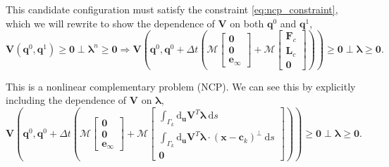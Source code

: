 \documentclass[preprint, 10pt]{elsarticle}
\begin{document}
This candidate configuration must satisfy the constraint
\eqref{eq:ncp_constraint}, which we will rewrite to show the dependence of
$\mathbf{V}$ on both $\mathbf{q}^0$ and $\mathbf{q}^{1}$,
\begin{equation}\label{eq:ncp_new}\mathbf{V}(\mathbf{q}^0,\mathbf{q}^{1})\geq
\mathbf{0}\perp \pmb{\lambda}^n\geq \mathbf{0} \Rightarrow
\mathbf{V}\left(\mathbf{q}^0, \mathbf{q}^0 + \Delta
t\left(\mathcal{M}\begin{bmatrix}\mathbf{0}\\\mathbf{0}\\\mathbf{e}_\infty\end{bmatrix}
+
\mathcal{M}\begin{bmatrix}\mathbf{F}_c\\\mathbf{L}_c\\\mathbf{0}\end{bmatrix}\right)\right)
\geq \mathbf{0} \perp\pmb{\lambda}\geq \mathbf{0} .\end{equation}

This is a nonlinear complementary problem (NCP). We can see this by explicitly
including the dependence of $\mathbf{V}$ on $\pmb{\lambda}$,
\[\mathbf{V}\left(\mathbf{q}^0, \mathbf{q}^0 + \Delta
t\left(\mathcal{M}\begin{bmatrix}\mathbf{0}\\\mathbf{0}\\\mathbf{e}_\infty\end{bmatrix}
+ \mathcal{M}\begin{bmatrix} \int_{\Gamma_k}
\text{d}_\mathbf{u}\mathbf{V}^T\pmb{\lambda}~\text{d}s\\ \int_{\Gamma_k}
\text{d}_\mathbf{u}\mathbf{V}^T\pmb{\lambda}\cdot(\mathbf{x}-\mathbf{c}_k)^\perp~\text{d}s
\\\mathbf{0}\end{bmatrix}\right)\right) \geq \mathbf{0} \perp\pmb{\lambda}\geq
\mathbf{0} .\]
\end{document}
